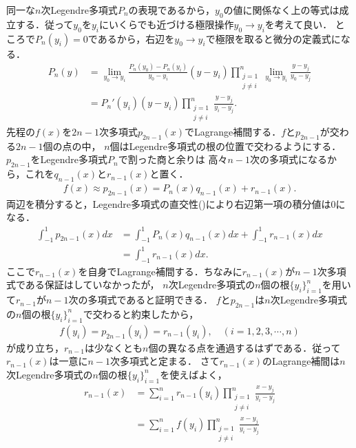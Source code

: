 \documentclass[a4j,papersize,disablejfam,slide,14pt]{jsarticle}
\begin{document}
    同一な$n$次{\rm Legendre}多項式$P_n$の表現であるから，$y_0$の値に関係なく上の等式は成立する．従って$y_0$を$y_i$にいくらでも近づける極限操作$y_0 \to y_i$を考えて良い．
    ところで$P_n(y_i) = 0$であるから，右辺を$y_0 \to y_i$で極限を取ると微分の定義式になる．
    \begin{align}
    	P_n(y) &= \lim_{y_0 \to y_i} \frac{P_n(y_0) - P_n(y_i)}{y_0 - y_i} (y - y_i) \prod_{\substack{j=1 \\ j \neq i}}^{n} \lim_{y_0 \to y_i} \frac{y-y_j}{y_0 - y_j} \\
        &= P_n'(y_i) (y - y_i) \prod_{\substack{j=1 \\ j \neq i}}^{n} \frac{y-y_j}{y_i - y_j}. \label{eq:legendre_limit}
    \end{align}
    先程の$f(x)$を$2n - 1$次多項式$p_{2n-1}(x)$で{\rm Lagrange}補間する．$f$と$p_{2n-1}$が交わる$2n-1$個の点の中，
    $n$個は{\rm Legendre}多項式の根の位置で交わるようにする．$p_{2n - 1}$を{\rm Legendre}多項式$P_n$で割った商と余りは
    高々$n-1$次の多項式になるから，これを$q_{n-1}(x)$と$r_{n-1}(x)$と置く．
    \begin{align}
    	f(x) \approx p_{2n-1}(x) = P_n(x) q_{n-1}(x) + r_{n-1}(x).
    \end{align}
    両辺を積分すると，{\rm Legendre}多項式の直交性()により右辺第一項の積分値は$0$になる．
    \begin{align}
    	\int_{-1}^{1} p_{2n-1}(x) dx &= \int_{-1}^{1} P_n(x) q_{n-1}(x) dx + \int_{-1}^{1} r_{n-1}(x) dx \\
        &= \int_{-1}^{1} r_{n-1}(x) dx.
    \end{align}
    ここで$r_{n-1}(x)$を自身で{\rm Lagrange}補間する．ちなみに$r_{n-1}(x)$が$n-1$次多項式である保証はしていなかったが，
    $n$次{\rm Legendre}多項式の$n$個の根$\{y_i\}_{i=1}^{n}$を用いて$r_{n-1}$が$n-1$次の多項式であると証明できる．
    $f$と$p_{2n-1}$は$n$次{\rm Legendre}多項式の$n$個の根$\{y_i\}_{i=1}^{n}$で交わると約束したから，
    \begin{align}
    	f(y_i) = p_{2n-1} (y_i) = r_{n-1} (y_i), \quad (i = 1,2,3,\cdots,n)
    \end{align}
    が成り立ち，$r_{n-1}$は少なくとも$n$個の異なる点を通過するはずである．従って$r_{n-1}(x)$は一意に$n-1$次多項式と定まる．
    さて$r_{n-1}(x)$の{\rm Lagrange}補間は$n$次{\rm Legendre}多項式の$n$個の根$\{y_i\}_{i=1}^{n}$を使えばよく，
    \begin{align}
    	r_{n-1} (x) &= \sum_{i=1}^{n} r_{n-1}(y_i) \prod_{\substack{j=1 \\ j \neq i}}^{n} \frac{x-y_j}{y_i - y_j} \\
        &= \sum_{i=1}^{n} f(y_i) \prod_{\substack{j=1 \\ j \neq i}}^{n} \frac{x-y_j}{y_i - y_j} \\
    \end{align}
\end{document}
